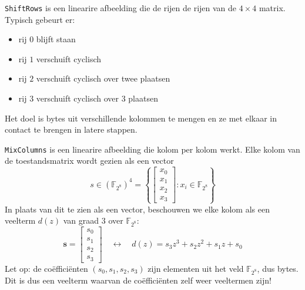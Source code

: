 
\texttt{ShiftRows} is een linearire afbeelding die de rijen de rijen van de $4 \times 4$ matrix. Typisch gebeurt er:
\begin{itemize}
    \item rij $0$ blijft staan
    \item rij $1$ verschuift cyclisch
    \item rij $2$ verschuift cyclisch over twee plaatsen
    \item rij $3$ verschuift cyclisch over 3 plaatsen
\end{itemize}
Het doel is bytes uit verschillende kolommen te mengen en ze met elkaar in contact te brengen in latere stappen.

\begin{center}
\resizebox{0.7\textwidth}{!}{%
    
}
\end{center}


\texttt{MixColumns} is een linearire afbeelding die kolom per kolom werkt. Elke kolom van de toestandsmatrix wordt gezien als een vector
\begin{equation*}
    s \in \left(\mathbb{F}_{2^8}\right)^4 = \left\{\begin{bmatrix}
        x_0 \\ x_1 \\ x_2 \\ x_3
    \end{bmatrix} : x_i \in \mathbb{F}_{2^8}\right\}
\end{equation*}
In plaats van dit te zien als een vector, beschouwen we elke kolom als een veelterm $d(z)$ van graad $3$ over $\mathbb{F}_{2^8}$:
\begin{equation*}
    \mathbf{s} = \begin{bmatrix}
        s_0 \\ s_1 \\ s_2 \\ s_3
    \end{bmatrix} \quad\longleftrightarrow\quad d(z) = s_3z^3 + s_2z^2 + s_1z + s_0
\end{equation*}
Let op: de coëfficiënten $(s_0, s_1, s_2, s_3)$ zijn elementen uit het veld $\mathbb{F}_{2^8}$, dus bytes. Dit is dus een veelterm waarvan de coëfficiënten zelf weer veeltermen zijn!

